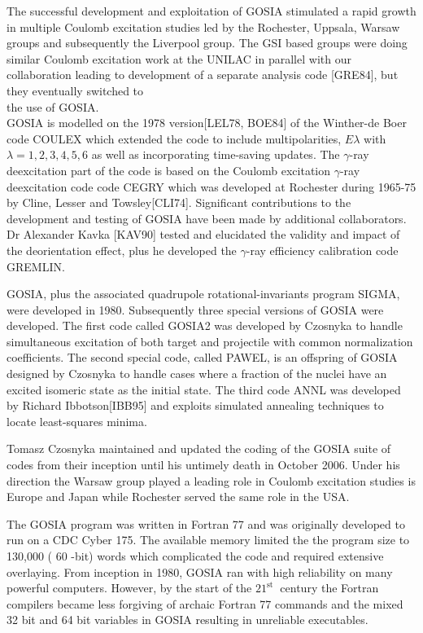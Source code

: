 \documentclass[10pt]{article}
\begin{document}
The successful development and exploitation of GOSIA stimulated a rapid growth in multiple Coulomb excitation studies led by the Rochester, Uppsala, Warsaw groups and subsequently the Liverpool group. The GSI based groups were doing similar Coulomb excitation work at the UNILAC in parallel with our collaboration leading to development of a separate analysis code [GRE84], but they eventually switched to\\
the use of GOSIA.\\[0pt]
GOSIA is modelled on the 1978 version[LEL78, BOE84] of the Winther-de Boer code COULEX which extended the code to include multipolarities, $E \lambda$ with $\lambda=1,2,3,4,5,6$ as well as incorporating time-saving updates. The $\gamma$-ray deexcitation part of the code is based on the Coulomb excitation $\gamma$-ray deexcitation code code CEGRY which was developed at Rochester during 1965-75 by Cline, Lesser and Towsley[CLI74]. Significant contributions to the development and testing of GOSIA have been made by additional collaborators. Dr Alexander Kavka [KAV90] tested and elucidated the validity and impact of the deorientation effect, plus he developed the $\gamma$-ray efficiency calibration code GREMLIN.

GOSIA, plus the associated quadrupole rotational-invariants program SIGMA, were developed in 1980. Subsequently three special versions of GOSIA were developed. The first code called GOSIA2 was developed by Czosnyka to handle simultaneous excitation of both target and projectile with common normalization coefficients. The second special code, called PAWEL, is an offspring of GOSIA designed by Czosnyka to handle cases where a fraction of the nuclei have an excited isomeric state as the initial state. The third code ANNL was developed by Richard Ibbotson[IBB95] and exploits simulated annealing techniques to locate least-squares minima.

Tomasz Czosnyka maintained and updated the coding of the GOSIA suite of codes from their inception until his untimely death in October 2006. Under his direction the Warsaw group played a leading role in Coulomb excitation studies is Europe and Japan while Rochester served the same role in the USA.

The GOSIA program was written in Fortran 77 and was originally developed to run on a CDC Cyber 175. The available memory limited the the program size to 130,000 ( 60 -bit) words which complicated the code and required extensive overlaying. From inception in 1980, GOSIA ran with high reliability on many powerful computers. However, by the start of the $21^{\text {st }}$ century the Fortran compilers became less forgiving of archaic Fortran 77 commands and the mixed 32 bit and 64 bit variables in GOSIA resulting in unreliable executables.
\end{document}
